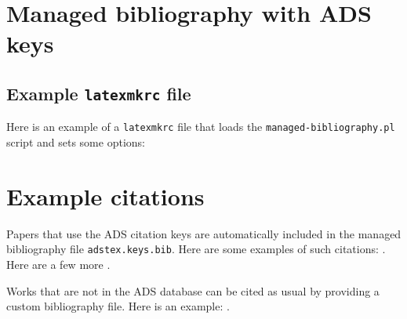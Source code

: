\documentclass{article}
\begin{document}
\section*{Managed bibliography with ADS keys} 


\subsection*{Example \texttt{latexmkrc} file}
Here is an example of a \texttt{latexmkrc} file that loads the \texttt{managed-bibliography.pl} script and sets some options:



\section*{Example citations}
Papers that use the ADS citation keys are automatically included in the managed bibliography file \texttt{adstex.keys.bib}.
Here are some examples of such citations:
\cite{%
    1958ZA.....46..108B,%
    1962AJ.....67..471K,%
    1966AJ.....71...64K%
}. 
Here are a few more
\cite{2002Sci...295...82K,2003PASP..115..763C}. 

Works that are not in the ADS database can be cited as usual by providing a custom bibliography file. Here is an example: \cite{mcgrail2004}.




\end{document}
